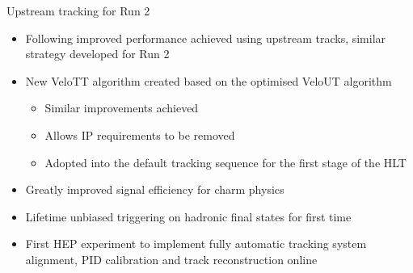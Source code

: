 \documentclass[aspectratio=1610]{beamer}
\begin{document}
\begin{frame}{Upstream tracking for Run 2}

\begin{itemize}
  \item Following improved performance achieved using upstream tracks, similar strategy developed for Run 2
  \item New VeloTT algorithm created based on the optimised VeloUT algorithm
  \begin{itemize}
    \item[\ding{80}] Similar improvements achieved
    \item[\ding{80}] Allows IP requirements to be removed
    \item[\ding{80}] Adopted into the default tracking sequence for the first stage of the HLT
  \end{itemize}
\end{itemize}

\begin{itemize}
  \item[\ding{80}] Greatly improved signal efficiency for charm physics
  \item[\ding{80}] Lifetime unbiased triggering on hadronic final states for first time
  \item[\ding{80}] First HEP experiment to implement fully automatic tracking system alignment, PID calibration and track reconstruction online
\end{itemize}

\end{frame}

{
 
 \begin{frame}[plain]
 \vspace{8.75cm}
 \hspace{-0.75cm}
 \huge\color{anti-flashwhite}{The decay \BdToKpimm}
 \end{frame}
}
\end{document}
